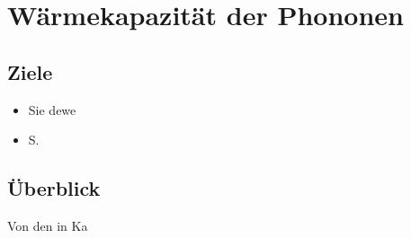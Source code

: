 
\chapter{Wärmekapazität der Phononen}





\section{Ziele}

\begin{itemize}
\item Sie dewe

\item S.

\end{itemize}





\section{Überblick}

Von den in Ka





\printbibliography[segment=\therefsegment,heading=subbibliography]
